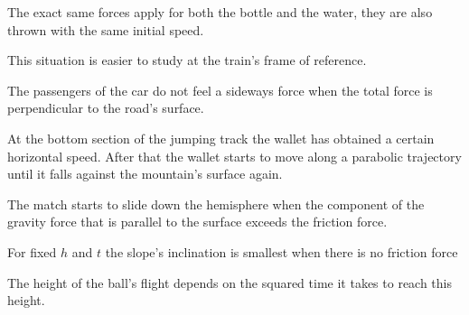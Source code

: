 \documentclass[11pt]{article}
\begin{document}

\hinteng
The exact same forces apply for both the bottle and the water, they are also thrown with the same initial speed.
\probend
\bigskip


\hinteng
This situation is easier to study at the train’s frame of reference.
\probend
\bigskip


\hinteng
The passengers of the car do not feel a sideways force when the total force is perpendicular to the road’s surface.
\probend
\bigskip


\hinteng
At the bottom section of the jumping track the wallet has obtained a certain horizontal speed. After that the wallet starts to move along a parabolic trajectory until it falls against the mountain’s surface again.
\probend
\bigskip


\hinteng
The match starts to slide down the hemisphere when the component of the gravity force that is parallel to the surface exceeds the friction force.
\probend
\bigskip


\hinteng
For fixed $h$ and $t$ the slope’s inclination is smallest when there is no friction force
\probend
\bigskip


\hinteng
The height of the ball’s flight depends on the squared time it takes to reach this height.
\probend
\bigskip

\end{document}
